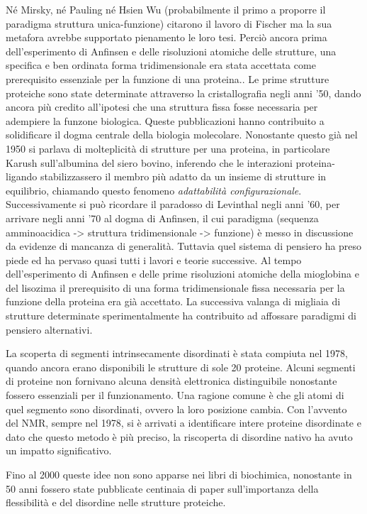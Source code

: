 {Né Mirsky, né Pauling né Hsien Wu (probabilmente il primo a proporre il paradigma struttura unica-funzione) citarono il lavoro di Fischer ma la sua metafora avrebbe supportato pienamento le loro tesi. Perciò ancora prima dell'esperimento di Anfinsen e delle risoluzioni atomiche delle strutture, una specifica e ben ordinata forma tridimensionale era stata accettata come prerequisito essenziale per la funzione di una proteina.\supercite{dunker2001intrinsically}. Le prime strutture proteiche sono state determinate attraverso la cristallografia negli anni '50, dando ancora più credito all'ipotesi che una struttura fissa fosse necessaria per adempiere la funzone biologica. Queste pubblicazioni hanno contribuito a solidificare il dogma centrale della biologia molecolare. Nonostante questo già nel 1950 si parlava di molteplicità di strutture per una proteina, in particolare Karush\supercite{karush1950heterogeneity} sull'albumina del siero bovino, inferendo che le interazioni proteina-ligando stabilizzassero il membro più adatto da un insieme di strutture in equilibrio, chiamando questo fenomeno \textit{adattabilità configurazionale}. Successivamente si può ricordare il paradosso di Levinthal negli anni '60, per arrivare negli anni '70 al dogma di Anfinsen, il cui paradigma (sequenza amminoacidica -> struttura tridimensionale -> funzione) è messo in discussione da evidenze di mancanza di generalità. Tuttavia quel sistema di pensiero ha preso piede ed ha pervaso quasi tutti i lavori e teorie successive. Al tempo dell'esperimento di Anfinsen e delle prime risoluzioni atomiche della mioglobina e del lisozima il prerequisito di una forma tridimensionale fissa necessaria per la funzione della proteina era già accettato. La successiva valanga di migliaia di strutture determinate sperimentalmente ha contribuito ad affossare paradigmi di pensiero alternativi.

\par La scoperta di segmenti intrinsecamente disordinati è stata compiuta nel 1978, quando ancora erano disponibili le strutture di sole 20 proteine. Alcuni segmenti di proteine non fornivano alcuna densità elettronica distinguibile nonostante fossero essenziali per il funzionamento. Una  ragione comune è che gli atomi di quel segmento sono disordinati, ovvero la loro posizione cambia. Con l'avvento del NMR, sempre nel 1978, si è arrivati a identificare intere proteine disordinate e dato che questo metodo è più preciso, la riscoperta di disordine nativo ha avuto un impatto significativo.

\par Fino al 2000\supercite{bracken2000disorder} queste idee non sono apparse nei libri di biochimica, nonostante in 50 anni fossero state pubblicate centinaia di paper sull'importanza della flessibilità e del disordine nelle strutture proteiche.

}
